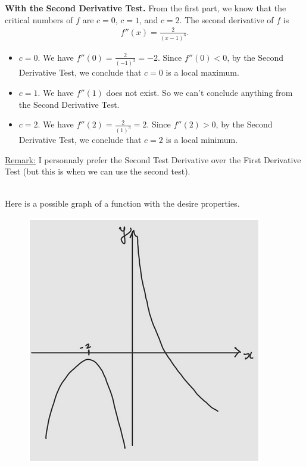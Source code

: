 	\textbf{With the Second Derivative Test.} From the first part, we know that the critical numbers of $f$ are $c = 0$, $c = 1$, and $c = 2$. The second derivative of $f$ is
		\begin{align*}
		f''(x) = \frac{2}{(x - 1)^3} .
		\end{align*}
	\begin{itemize}
	\item $c = 0$. We have $f''(0) = \frac{2}{(-1)^3} = -2$. Since $f''(0) < 0$, by the Second Derivative Test, we conclude that $c = 0$ is a local maximum.
	\item $c = 1$. We have $f''(1)$ does not exist. So we can't conclude anything from the Second Derivative Test.
	\item $c = 2$. We have $f''(2) = \frac{2}{(1)^3} = 2$. Since $f''(2) > 0$, by the Second Derivative Test, we conclude that $c = 2$ is a local minimum.
	\end{itemize}
	
	\underline{Remark:} I personnaly prefer the Second Test Derivative over the First Derivative Test (but this is when we can use the second test).
		
	\newpage
	
	\\
	Here is a possible graph of a function with the desire properties.
	
	\begin{figure}[ht]
	\centering
	\includegraphics[scale=0.6]{number22.png}
	\end{figure}
	
